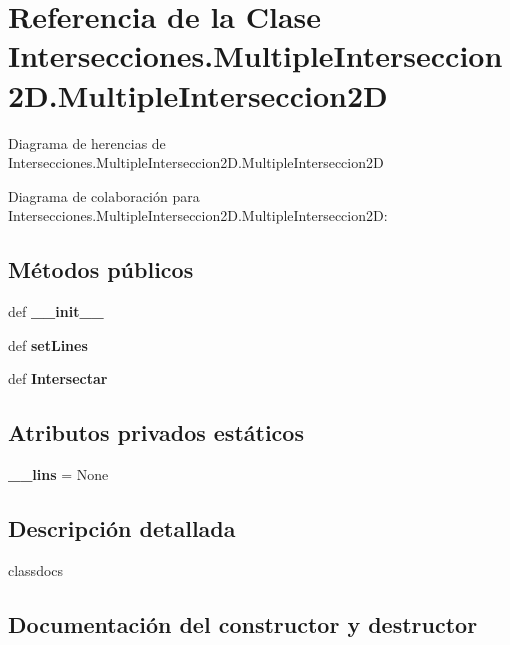 \section{Referencia de la Clase Intersecciones.\-Multiple\-Interseccion2\-D.\-Multiple\-Interseccion2\-D}
\label{classIntersecciones_1_1MultipleInterseccion2D_1_1MultipleInterseccion2D}


Diagrama de herencias de Intersecciones.\-Multiple\-Interseccion2\-D.\-Multiple\-Interseccion2\-D


Diagrama de colaboración para Intersecciones.\-Multiple\-Interseccion2\-D.\-Multiple\-Interseccion2\-D\-:
\subsection*{Métodos públicos}
\begin{DoxyCompactItemize}
\item 
def {\bf \-\_\-\-\_\-init\-\_\-\-\_\-}
\item 
def {\bf set\-Lines}
\item 
def {\bf Intersectar}
\end{DoxyCompactItemize}
\subsection*{Atributos privados estáticos}
\begin{DoxyCompactItemize}
\item 
{\bf \-\_\-\-\_\-lins} = None
\end{DoxyCompactItemize}


\subsection{Descripción detallada}
\begin{DoxyVerb}classdocs
\end{DoxyVerb}
 

\subsection{Documentación del constructor y destructor}
